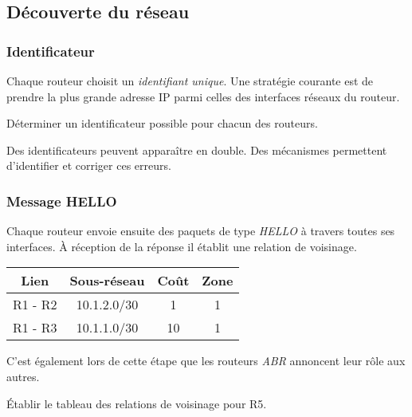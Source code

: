 \documentclass[a4paper,11pt]{article}
\begin{document}
\subsection{Découverte du réseau}
\subsubsection{Identificateur}
Chaque routeur choisit un \emph{identifiant unique}. Une stratégie courante est de prendre la plus grande adresse IP parmi celles des interfaces réseaux du routeur.
\begin{activite}
Déterminer un identificateur possible pour chacun des routeurs.
\end{activite}
\begin{aretenir}[Remarque]
Des identificateurs peuvent apparaître en double. Des mécanismes permettent d'identifier et corriger ces erreurs.
\end{aretenir}
\begin{center}
\end{center}
\subsubsection{Message HELLO}
Chaque routeur envoie ensuite des paquets de type \emph{HELLO} à travers toutes ses interfaces. À réception de la réponse il établit une relation de voisinage.
\begin{center}
    \begin{tabular}{|*{4}{c|}}
        \hline
        Lien & Sous-réseau & Coût & Zone \\
        \hline
        R1 - R2 & 10.1.2.0/30 & 1 & 1 \\
        \hline
        R1 - R3 & 10.1.1.0/30 & 10 & 1 \\
        \hline
    \end{tabular}
\end{center}
\begin{aretenir}[Remarque]
    C'est également lors de cette étape que les routeurs \emph{ABR} annoncent leur rôle aux autres.
    \end{aretenir}
\begin{activite}
Établir le tableau des relations de voisinage pour R5.
\end{activite}
\end{document}
